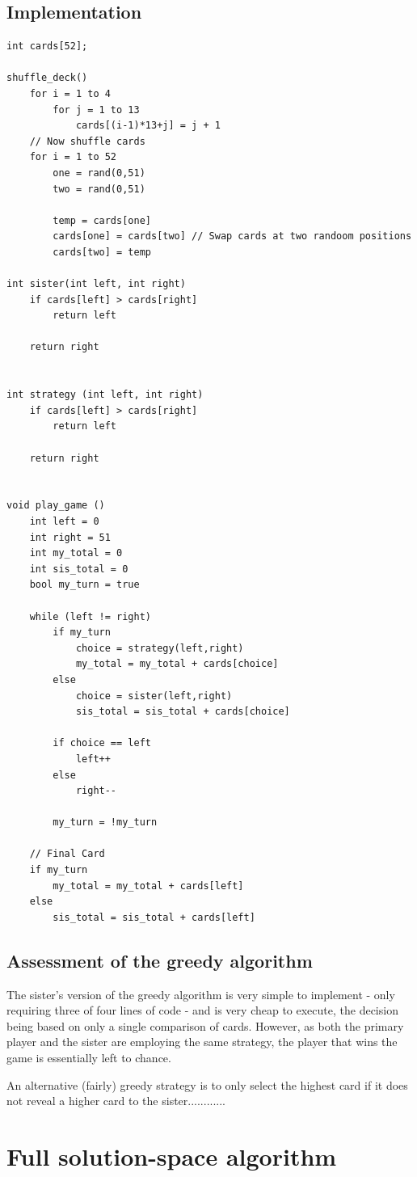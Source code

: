 \documentclass[11pt]{article}
\begin{document}
\subsection{Implementation}
\begin{lstlisting}
int cards[52];

shuffle_deck()
	for i = 1 to 4
		for j = 1 to 13
			cards[(i-1)*13+j] = j + 1
	// Now shuffle cards
	for i = 1 to 52
		one = rand(0,51)
		two = rand(0,51)

		temp = cards[one]
		cards[one] = cards[two] // Swap cards at two randoom positions
		cards[two] = temp

int sister(int left, int right)
	if cards[left] > cards[right]
		return left
	
	return right


int strategy (int left, int right)
	if cards[left] > cards[right]
		return left

	return right


void play_game ()
	int left = 0
	int right = 51
	int my_total = 0
	int sis_total = 0
	bool my_turn = true

	while (left != right)
		if my_turn
			choice = strategy(left,right)
			my_total = my_total + cards[choice]
		else
			choice = sister(left,right)
			sis_total = sis_total + cards[choice]

		if choice == left
			left++
		else
			right--

		my_turn = !my_turn

	// Final Card
	if my_turn
		my_total = my_total + cards[left]
	else
		sis_total = sis_total + cards[left]
\end{lstlisting}

\subsection{Assessment of the greedy algorithm}

The sister's version of the greedy algorithm is very simple to implement - only requiring three of four lines of code - and is very cheap to execute, the decision being based on only a single comparison of cards. However, as both the primary player and the sister are employing the same strategy, the player that wins the game is essentially left to chance.

An alternative (fairly) greedy strategy is to only select the highest card if it does not reveal a higher card to the sister............

\section{Full solution-space algorithm}
\end{document}
